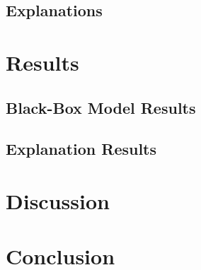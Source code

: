 \documentclass{article}
\begin{document}
		\subsection{Explanations}
	\section{Results}
		\subsection{Black-Box Model Results}
		\subsection{Explanation Results}
	\section{Discussion}
	\section{Conclusion}
	\newpage
	\sloppy
	\printbibliography
\end{document}
